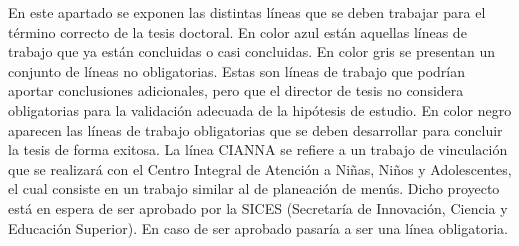 En este apartado se exponen las distintas líneas que se deben trabajar para el término correcto de la tesis
doctoral.
%
En color azul están aquellas líneas de trabajo que ya están concluidas o casi concluidas.
%
En color gris se presentan un conjunto de líneas no obligatorias. 
%
Estas son líneas de trabajo que podrían aportar conclusiones adicionales, pero que el director de tesis
no considera obligatorias para la validación adecuada de la hipótesis de estudio.
%
En color negro aparecen las líneas de trabajo obligatorias que se deben desarrollar para concluir la tesis
de forma exitosa.
%
La línea CIANNA se refiere a un trabajo de vinculación que se realizará con el 
Centro Integral de Atención a Niñas, Niños y Adolescentes, el cual consiste en un trabajo
similar al de planeación de menús.
%
Dicho proyecto está en espera de ser aprobado por la SICES (Secretaría de Innovación, Ciencia y Educación Superior).
%
En caso de ser aprobado pasaría a ser una línea obligatoria.

